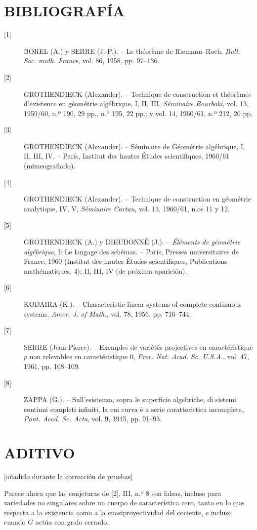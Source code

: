 \section*{BIBLIOGRAFÍA}

\begin{description}
\item[{[1]}] BOREL (A.) y SERRE (J.-P.). -- Le théorème de Riemann--Roch,
\emph{Bull. Soc. math. France}, vol. 86, 1958, pp. 97--136.

\item[{[2]}] GROTHENDIECK (Alexander). -- Technique de construction et
théorèmes d'existence en géométrie algébrique, I, II, III, \emph{Séminaire
Bourbaki}, vol. 13, 1959/60, n.º 190, 29 pp., n.º 195, 22 pp.; y vol. 14,
1960/61, n.º 212, 20 pp.

\item[{[3]}] GROTHENDIECK (Alexander). -- Séminaire de Géométrie algébrique,
I, II, III, IV. -- París, Institut des hautes Études scientifiques, 1960/61
(mimeografiado).

\item[{[4]}] GROTHENDIECK (Alexander). -- Technique de construction en
géométrie analytique, IV, V, \emph{Séminaire Cartan}, vol. 13, 1960/61, n.os 11
y 12.

\item[{[5]}] GROTHENDIECK (A.) y DIEUDONNÉ (J.). -- \emph{Éléments de
géométrie algébrique}, I: Le langage des schémas. -- París, Presses
universitaires de France, 1960 (Institut des hautes Études scientifiques,
Publications mathématiques, 4); II, III, IV (de próxima aparición).

\item[{[6]}] KODAIRA (K.). -- Characteristic linear systems of complete
continuous systems, \emph{Amer. J. of Math.}, vol. 78, 1956, pp. 716--744.

\item[{[7]}] SERRE (Jean-Pierre). -- Exemples de variétés projectives en
caractéristique $p$ non relevables en caractéristique 0, \emph{Proc. Nat. Acad.
Sc. U.S.A.}, vol. 47, 1961, pp. 108--109.

\item[{[8]}] ZAPPA (G.). -- Sull'esistenza, sopra le superficie algebriche, di
sistemi continui completi infiniti, la cui curva è a serie caratteristica
incompleta, \emph{Pont. Acad. Sc. Acta}, vol. 9, 1945, pp. 91--93.
\end{description}

\section*{ADITIVO}
\begin{center}
{\small [añadido durante la corrección de pruebas]}
\end{center}

Parece ahora que las conjeturas de [2], III, n.º 8 son falsas, incluso para
variedades no singulares sobre un cuerpo de característica cero, tanto en lo
que respecta a la existencia como a la cuasiproyectividad del cociente, e
incluso cuando $G$ actúa con grafo cerrado.
